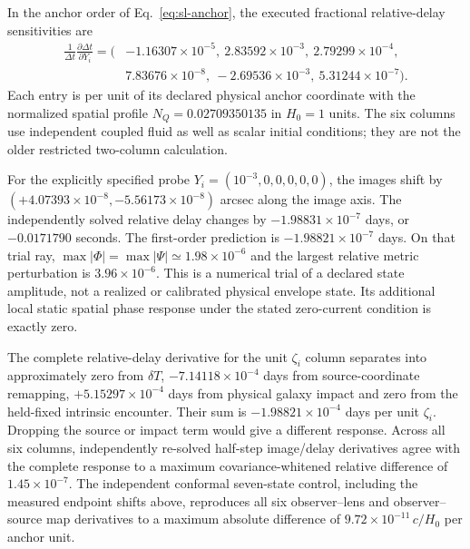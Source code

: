In the anchor order of Eq.~\eqref{eq:sl-anchor}, the executed fractional
relative-delay sensitivities are
\begin{equation}
 \begin{aligned}
 \frac{1}{\Delta t}\frac{\partial\Delta t}{\partial Y_i}
 =\big(&-1.16307\times10^{-5},\ 2.83592\times10^{-3},\
 2.79299\times10^{-4},\\
 &7.83676\times10^{-8},\ -2.69536\times10^{-3},\
 5.31244\times10^{-7}\big).
 \end{aligned}
 \label{eq:sl-delay-sensitivity}
\end{equation}
Each entry is per unit of its declared physical anchor coordinate with
the normalized spatial profile $N_Q=0.02709350135$ in $H_0=1$ units.
The six columns use independent coupled fluid as well as scalar initial
conditions; they are not the older restricted two-column calculation.

For the explicitly specified probe $Y_i=(10^{-3},0,0,0,0,0)$, the images
shift by $(+4.07393\times10^{-8},-5.56173\times10^{-8})$ arcsec along
the image axis. The independently solved relative delay changes by
$-1.98831\times10^{-7}$ days, or $-0.0171790$ seconds. The first-order
prediction is $-1.98821\times10^{-7}$ days. On that trial ray,
$\max|\Phi|=\max|\Psi|\simeq1.98\times10^{-6}$ and the largest relative
metric perturbation is $3.96\times10^{-6}$. This is a numerical trial
of a declared state amplitude, not a realized or calibrated physical
envelope state. Its additional local static spatial phase response under
the stated zero-current condition is exactly zero.

The complete relative-delay derivative for the unit $\zeta_i$ column
separates into approximately zero from $\delta T$,
$-7.14118\times10^{-4}$ days from source-coordinate remapping,
$+5.15297\times10^{-4}$ days from physical galaxy impact and zero from
the held-fixed intrinsic encounter. Their sum is
$-1.98821\times10^{-4}$ days per unit $\zeta_i$. Dropping the source or
impact term would give a different response. Across all six columns,
independently re-solved half-step image/delay derivatives agree with the
complete response to a maximum covariance-whitened relative difference
of $1.45\times10^{-7}$.
The independent conformal seven-state control, including the measured
endpoint shifts above, reproduces all six observer--lens and
observer--source map derivatives to a maximum absolute difference of
$9.72\times10^{-11}\,c/H_0$ per anchor unit.

